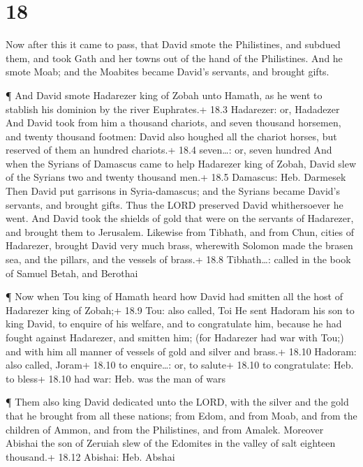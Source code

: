 \hypertarget{section-17}{%
\section{18}\label{section-17}}

 Now after this it came to pass, that David smote the
Philistines, and subdued them, and took Gath and her towns out of the
hand of the Philistines.  And he smote Moab; and the
Moabites became David's servants, and brought gifts.

 ¶ And David smote Hadarezer king of Zobah unto Hamath, as
he went to stablish his dominion by the river Euphrates.+ 18.3
Hadarezer: or, Hadadezer  And David took from him a thousand
chariots, and seven thousand horsemen, and twenty thousand footmen:
David also houghed all the chariot horses, but reserved of them an
hundred chariots.+ 18.4 seven\ldots: or, seven hundred  And
when the Syrians of Damascus came to help Hadarezer king of Zobah, David
slew of the Syrians two and twenty thousand men.+ 18.5 Damascus: Heb.
Darmesek  Then David put garrisons in Syria-damascus; and
the Syrians became David's servants, and brought gifts. Thus the LORD
preserved David whithersoever he went.  And David took the
shields of gold that were on the servants of Hadarezer, and brought them
to Jerusalem.  Likewise from Tibhath, and from Chun, cities
of Hadarezer, brought David very much brass, wherewith Solomon made the
brasen sea, and the pillars, and the vessels of brass.+ 18.8
Tibhath\ldots: called in the book of Samuel Betah, and Berothai

 ¶ Now when Tou king of Hamath heard how David had smitten
all the host of Hadarezer king of Zobah;+ 18.9 Tou: also called, Toi
 He sent Hadoram his son to king David, to enquire of his
welfare, and to congratulate him, because he had fought against
Hadarezer, and smitten him; (for Hadarezer had war with Tou;) and with
him all manner of vessels of gold and silver and brass.+ 18.10 Hadoram:
also called, Joram+ 18.10 to enquire\ldots: or, to salute+ 18.10 to
congratulate: Heb. to bless+ 18.10 had war: Heb. was the man of wars

 ¶ Them also king David dedicated unto the LORD, with the
silver and the gold that he brought from all these nations; from Edom,
and from Moab, and from the children of Ammon, and from the Philistines,
and from Amalek.  Moreover Abishai the son of Zeruiah slew
of the Edomites in the valley of salt eighteen thousand.+ 18.12 Abishai:
Heb. Abshai

